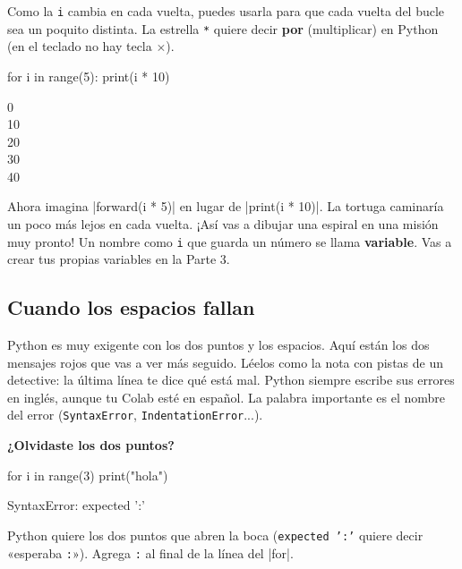 Como la \texttt{i} cambia en cada vuelta, puedes usarla para que cada vuelta del bucle sea un poquito distinta. La estrella \texttt{*} quiere decir \textbf{por} (multiplicar) en Python (en el teclado no hay tecla $\times$).

\begin{tcbraster}[raster columns=2, raster equal height=rows, raster column skip=12pt, raster valign=center]
\begin{code}
for i in range(5):
    print(i * 10)
\end{code}
\begin{outputbox}
0\\
10\\
20\\
30\\
40
\end{outputbox}
\end{tcbraster}

Ahora imagina \py|forward(i * 5)| en lugar de \py|print(i * 10)|. La tortuga caminaría un poco más lejos en cada vuelta. ¡Así vas a dibujar una espiral en una misión muy pronto! Un nombre como \texttt{i} que guarda un número se llama \textbf{variable}. Vas a crear tus propias variables en la Parte 3.

\subsection*{Cuando los espacios fallan}

Python es muy exigente con los dos puntos y los espacios. Aquí están los dos mensajes rojos que vas a ver más seguido. Léelos como la nota con pistas de un detective: la última línea te dice qué está mal. Python siempre escribe sus errores en inglés, aunque tu Colab esté en español. La palabra importante es el nombre del error (\texttt{SyntaxError}, \texttt{IndentationError}...).

\textbf{¿Olvidaste los dos puntos?}

\begin{codenonum}
for i in range(3)
    print("hola")
\end{codenonum}
\begin{errorbox}
SyntaxError: expected ':'
\end{errorbox}

Python quiere los dos puntos que abren la boca (\texttt{expected ':'} quiere decir «esperaba \texttt{:}»). Agrega \texttt{:} al final de la línea del \py|for|.

